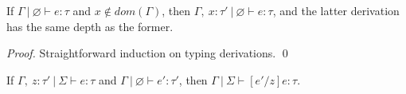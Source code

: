 \documentclass{llncs}
\begin{document}
\vspace{8pt}

\begin{lemma}[Weakening]
If $\Gamma~|~\varnothing \vdash e : \tau$ and $x \not\in dom(\Gamma)$, then $\Gamma,~x : \tau'~|~\varnothing \vdash e : \tau$, and the latter derivation has the same depth as the former.
\end{lemma}

\begin{proof}
Straightforward induction on typing derivations. \qed
\end{proof}

\vspace{8pt}

\begin{lemma}
If $\Gamma,~z : \tau'~|~\Sigma \vdash e : \tau$ and $\Gamma~|~\varnothing \vdash e' : \tau'$, then $\Gamma~|~\Sigma \vdash [e'/z]e : \tau$.
\end{lemma}
\end{document}
